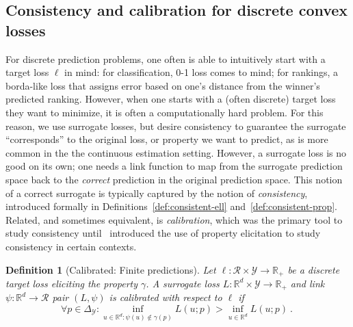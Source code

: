 \documentclass{article}
\newcommand{\reals}{\mathbb{R}}
\newcommand{\simplex}{\Delta_\Y}
\newcommand{\R}{\mathcal{R}}
\newcommand{\Y}{\mathcal{Y}}
\newtheorem{definition}{Definition}
\begin{document}
\subsection{Consistency and calibration for discrete convex losses}\label{subsec:convex-surrogates}

For discrete prediction problems, one often is able to intuitively start with a target loss $\ell$ in mind: for classification, 0-1 loss comes to mind; for rankings, a borda-like loss that assigns error based on one's distance from the winner's predicted ranking.
However, when one starts with a (often discrete) target loss they want to minimize, it is often a computationally hard problem.
For this reason, we use surrogate losses, but desire consistency to guarantee the surrogate ``corresponds'' to the original loss, or property we want to predict, as is more common in the the continuous estimation setting.
However, a surrogate loss is no good on its own; one needs a link function to map from the surrogate prediction space back to the \emph{correct} prediction in the original prediction space.
This notion of a correct surrogate is typically captured by the notion of \emph{consistency}, introduced formally in Definitions~\ref{def:consistent-ell} and~\ref{def:consistent-prop}.
Related, and sometimes equivalent, is \emph{calibration}, which was the primary tool to study consistency until~\cite{agarwal2015consistent} introduced the use of property elicitation to study consistency in certain contexts.

\begin{definition}[Calibrated: Finite predictions]\label{def:calibrated-finite}
	Let $\ell : \R \times \Y \to \reals_+$ be a discrete target loss eliciting the property $\gamma$.
	A surrogate loss $L : \reals^d \times \Y \to \reals_+$  and link $\psi:\reals^d \to \R$ pair $(L, \psi)$ is \emph{calibrated} with respect to $\ell$ if 
	\begin{equation}\label{eq:calibration}
	\forall p \in \simplex: \inf_{u \in \reals^d : \psi(u) \not \in \gamma(p)} L(u;p) > \inf_{u \in \reals^d} L(u;p)~.~
	\end{equation}
\end{definition}
\end{document}
